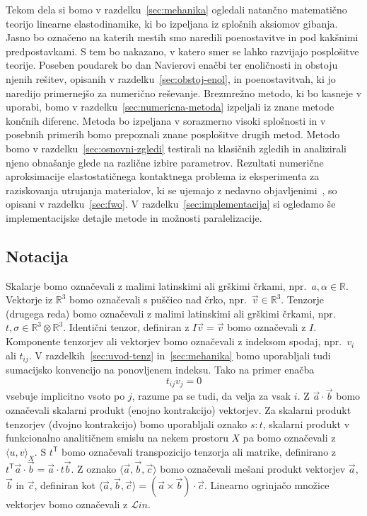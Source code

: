 \documentclass[12pt,a4paper,twoside]{article}
\theoremstyle{definition} %
\theoremstyle{plain} %
\numberwithin{equation}{section}
\newcommand{\R}{\mathbb R}
\newcommand{\T}{\mathsf{T}}
\newcommand{\Lin}{\mathcal{L}in}
\newcommand{\vv}{\vec{v}}
\newcommand{\va}{\vec{a}}
\newcommand{\vc}{\vec{c}}
\newcommand{\vb}{\vec{b}}
\begin{document}
Tekom dela si bomo v razdelku~\ref{sec:mehanika} ogledali natančno matematično teorijo linearne
elastodinamike, ki bo izpeljana iz splošnih aksiomov gibanja. Jasno bo označeno na katerih mestih smo
naredili poenostavitve in pod kakšnimi predpostavkami. S tem bo nakazano, v katero smer se lahko
razvijajo posplošitve teorije. Poseben poudarek bo dan Navierovi enačbi ter enoličnosti in obstoju
njenih rešitev, opisanih v razdelku~\ref{sec:obstoj-enol}, in poenostavitvah, ki jo naredijo
primernejšo za numerično reševanje.  Brezmrežno metodo, ki bo kasneje v uporabi, bomo v
razdelku~\ref{sec:numericna-metoda} izpeljali iz znane metode končnih diferenc. Metoda bo izpeljana
v sorazmerno visoki splošnosti in v posebnih primerih bomo prepoznali znane posplošitve drugih
metod. Metodo bomo v razdelku~\ref{sec:osnovni-zgledi} testirali na klasičnih zgledih in analizirali
njeno obnašanje glede na različne izbire parametrov. Rezultati numerične aproksimacije
elastostatičnega kontaktnega problema iz eksperimenta za raziskovanja utrujanja materialov, ki se
ujemajo z nedavno objavljenimi~\cite{pereira2016convergence}, so opisani v razdelku~\ref{sec:fwo}. V
razdelku~\ref{sec:implementacija} si ogledamo še implementacijske detajle metode in možnosti
paralelizacije.

\subsection{Notacija}
Skalarje bomo označevali z malimi latinskimi ali grškimi črkami, npr.~$a, \alpha
\in \R$. Vektorje iz $\R^3$ bomo označevali s puščico nad črko, npr.~$\vv \in
\R^3$. Tenzorje (drugega reda) bomo označevali z malimi latinskimi ali grškimi
črkami, npr.~$t, \sigma \in \R^3\otimes\R^3$. Identični tenzor, definiran z $I\vv = \vv$ bomo
označevali z $I$. Komponente tenzorjev ali vektorjev bomo označevali z indeksom spodaj, npr.~$v_i$
ali $t_{ij}$.  V razdelkih~\ref{sec:uvod-tenz} in~\ref{sec:mehanika} bomo uporabljali tudi
sumacijsko konvencijo na ponovljenem indeksu. Tako na primer enačba
\[
  t_{ij}v_j = 0
\]
vsebuje implicitno vsoto po $j$, razume pa se tudi, da velja za vsak $i$.  Z $\va\cdot\vb$ bomo
označevali skalarni produkt (enojno kontrakcijo) vektorjev. Za skalarni produkt tenzorjev (dvojno
kontrakcijo) bomo uporabljali oznako $s:t$, skalarni produkt v funkcionalno analitičnem smislu na
nekem prostoru $X$ pa bomo označevali z $\langle u, v\rangle_X$.  S $t^\T$ bomo označevali
transpozicijo tenzorja ali matrike, definirano z $t^\T\va \cdot \vb = \va\cdot t\vb$. Z oznako
$\langle \va, \vb, \vc\rangle$ bomo označevali mešani produkt vektorjev $\va$, $\vb$ in $\vc$,
definiran kot $\langle \va, \vb, \vc\rangle = (\va\times\vb)\cdot \vc$.
Linearno ogrinjačo množice vektorjev bomo označevali z $\Lin$.
\end{document}
